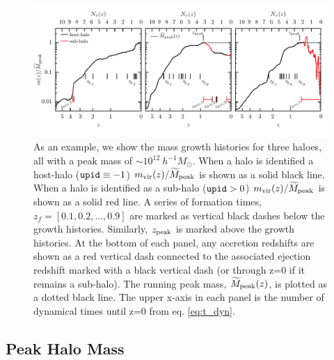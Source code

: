\documentclass[a4paper,fleqn,usenatbib]{mnras}
\begin{document}
\begin{figure}
    \includegraphics{figures/growth_hist.pdf}
    \caption{As an example, we show the mass growth histories for three haloes, all with a peak mass of $\sim 10^{12}~h^{-1}M_{\odot}$.  When a halo is identified a host-halo (${\tt upid} \equiv -1$) $m_{\rm vir}(z)/\widetilde{M}_{\rm peak}$ is shown as a solid black line.  When a halo is identified as a sub-halo (${\tt upid} > 0$) $m_{\rm vir}(z)/\widetilde{M}_{\rm peak}$ is shown as a solid red line.  A series of formation times, $z_{f} = [0.1,0.2,...,0.9]$ are marked as vertical black dashes below the growth histories.  Similarly, $z_{\rm peak}$ is marked above the growth histories.  At the bottom of each panel, any accretion redshifts are shown as a red vertical dash connected to the associated ejection redshift marked with a black vertical dash (or through z=0 if it remains a sub-halo).  The running peak mass, $\widetilde{M}_{\rm peak}(z)$, is plotted as a dotted black line.  The upper x-axis in each panel is the number of dynamical times until z=0 from eq. \ref{eq:t_dyn}.}
    \label{fig:growth_hist}
\end{figure}

\subsection{Peak Halo Mass}
\end{document}
